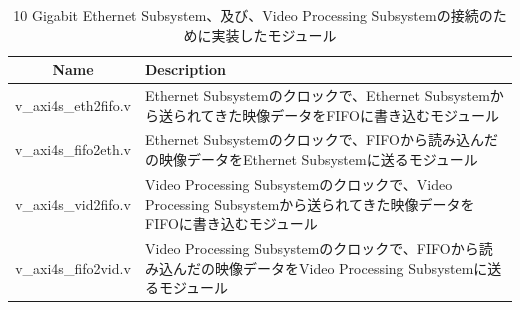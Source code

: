 \begin{table}[htbp]
  \caption{10 Gigabit Ethernet Subsystem、及び、Video Processing Subsystemの接続のために実装したモジュール}
  \label{tb:fpga-implement-modules}
  \begin{center}
  \begin{tabular}{c|p{12cm}}
    \hline
    Name               & Description \\\hline\hline
    v\_axi4s\_eth2fifo.v & Ethernet Subsystemのクロックで、Ethernet Subsystemから送られてきた映像データをFIFOに書き込むモジュール \\\hline
    v\_axi4s\_fifo2eth.v & Ethernet Subsystemのクロックで、FIFOから読み込んだの映像データをEthernet Subsystemに送るモジュール \\\hline
    v\_axi4s\_vid2fifo.v & Video Processing Subsystemのクロックで、Video Processing Subsystemから送られてきた映像データをFIFOに書き込むモジュール \\\hline
    v\_axi4s\_fifo2vid.v & Video Processing Subsystemのクロックで、FIFOから読み込んだの映像データをVideo Processing Subsystemに送るモジュール \\\hline
  \end{tabular}\end{center}
\end{table}







